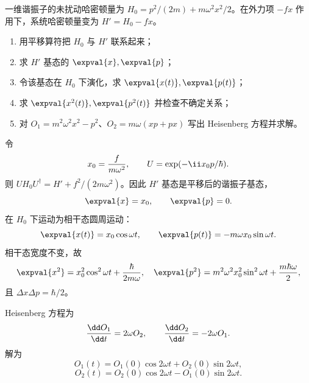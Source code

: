 \begin{question}
一维谐振子的未扰动哈密顿量为 $H_0=p^2/(2m)+m\omega^2x^2/2$。在外力项 $-fx$ 作用下，系统哈密顿量变为 $H'=H_0-fx$。
\begin{enumerate}
  \item 用平移算符把 $H_0$ 与 $H'$ 联系起来；
  \item 求 $H'$ 基态的 $\expval{x},\expval{p}$；
  \item 令该基态在 $H_0$ 下演化，求 $\expval{x(t)},\expval{p(t)}$；
  \item 求 $\expval{x^2(t)},\expval{p^2(t)}$ 并检查不确定关系；
  \item 对 $O_1=m^2\omega^2x^2-p^2$、$O_2=m\omega(xp+px)$ 写出 Heisenberg 方程并求解。
\end{enumerate}
\begin{solution}
令
\[
  x_0={f\over m\omega^2},
  \qquad U=\exp(-\ii x_0p/\hbar).
\]
则 $U H_0 U^\dagger=H'+f^2/(2m\omega^2)$。因此 $H'$ 基态是平移后的谐振子基态，
\[
  \expval{x}=x_0,
  \qquad \expval{p}=0.
\]
在 $H_0$ 下运动为相干态圆周运动：
\[
  \expval{x(t)}=x_0\cos\omega t,
  \qquad \expval{p(t)}=-m\omega x_0\sin\omega t.
\]
相干态宽度不变，故
\[
  \expval{x^2}=x_0^2\cos^2\omega t+{\hbar\over2m\omega},
  \quad
  \expval{p^2}=m^2\omega^2x_0^2\sin^2\omega t+{m\hbar\omega\over2},
\]
且 $\Delta x\Delta p=\hbar/2$。

Heisenberg 方程为
\[
  {\dd O_1\over\dd t}=2\omega O_2,
  \qquad
  {\dd O_2\over\dd t}=-2\omega O_1.
\]
解为
\[
  O_1(t)=O_1(0)\cos2\omega t+O_2(0)\sin2\omega t,
\]
\[
  O_2(t)=O_2(0)\cos2\omega t-O_1(0)\sin2\omega t.
\]
\end{solution}
\end{question}

